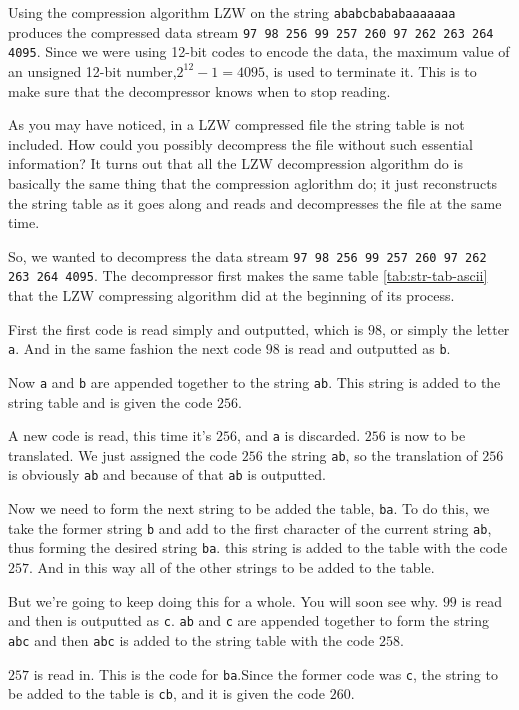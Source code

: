 \begin{refsection}
Using the compression algorithm LZW on the string
\texttt{ababcbababaaaaaaa} produces the compressed data stream
\texttt{97 98 256 99 257 260 97 262 263 264 4095}. Since we were using
12-bit codes to encode the data, the maximum value of an unsigned
12-bit number,$2^{12} - 1 = 4095$, is used to terminate it. This is to
make sure that the decompressor knows when to stop reading.

As you may have noticed, in a LZW compressed file the string table is
not included. How could you possibly decompress the file without such
essential information? It turns out that all the LZW decompression
algorithm do is basically the same thing that the compression aglorithm do; it
just reconstructs the string table as it goes along and  reads and decompresses the
file at the same time.

So, we wanted to decompress the data stream \texttt{97 98 256 99 257
  260 97 262 263 264 4095}. The decompressor first makes the same
table \ref{tab:str-tab-ascii}  that the LZW compressing algorithm did at the beginning of
its process.

First the first code is read simply and outputted, which is $98$, or
simply the letter \texttt{a}. And in the same fashion the next code
$98$ is read and outputted as \texttt{b}.

Now \texttt{a} and \texttt{b} are appended together to the string
\texttt{ab}. This string is added to the string table and is given the
code $256$.

A new code is read, this time it's $256$, and \texttt{a} is
discarded. $256$ is now to be translated. We just assigned the code
$256$ the string \texttt{ab}, so the translation of $256$ is obviously
\texttt{ab} and because of that \texttt{ab} is outputted.

Now we need to form the next string to be added the table,
\texttt{ba}. To do this, we take the former string \texttt{b} and add
to the first character of the current string \texttt{ab}, thus forming
the desired string \texttt{ba}. this string is added to the table with
the code $257$. And in this way all of the other strings to be added
to the table.

But we're going to keep doing this for a whole. You will soon see
why. $99$ is read and then is outputted as \texttt{c}. \texttt{ab} and
\texttt{c} are appended together to form the string \texttt{abc} and then
\texttt{abc} is added to the string table with the code $258$.

$257$ is read in. This is the code for \texttt{ba}.Since the former
code was \texttt{c}, the string to be added to the table is
\texttt{cb}, and it is given the code $260$.


\end{refsection}
